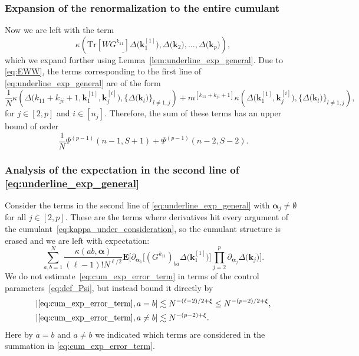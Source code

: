 \documentclass[10pt]{amsart}
\numberwithin{equation}{section}
\newcommand{\E}{\mathbf{E}}
\begin{document}
\subsubsection{Expansion of the renormalization to the entire cumulant}\label{sec:hit_two_args}
Now we are left with the term
\begin{equation}
\kappa\left(\underline{\mathrm{Tr}\left[WG^{k_{11}}\right]\Delta\big(\bm{k}^{[1]}_1\big)}, \Delta\big(\bm{k}_2\big),\ldots, \Delta\big(\bm{k}_p\big)\right),
\end{equation}
which we expand further using Lemma~\ref{lem:underline_exp_general}. Due to \eqref{eq:EWW}, the terms corresponding to the first line of \eqref{eq:underline_exp_general} are of the form
\begin{equation}
\frac{1}{N}\kappa\left(\Delta\big(k_{11}+k_{ji}+1,\bm{k}_1^{[1]},\bm{k}_j^{[i]}\big),\{\Delta\big(\bm{k}_l\big)\}_{l\neq 1,j}\right)+ m^{[k_{11}+k_{ji}+1]}\kappa\left(\Delta\big(\bm{k}_1^{[1]},\bm{k}_j^{[i]}\big),\{\Delta\big(\bm{k}_l\big)\}_{l\neq 1,j}\right),
\end{equation}
for $j\in [2,p]$ and $i\in [n_j]$. Therefore, the sum of these terms has an upper bound of order
\begin{equation}
\frac{1}{N}\Psi^{(p-1)}(n-1,S+1)+\Psi^{(p-1)}(n-2,S-2).
\label{eq:err_1_2}
\end{equation}

\subsubsection{Analysis of the expectation in the second line of \eqref{eq:underline_exp_general}}\label{sec:cum_exp_last_term}
Consider the terms in the second line of \eqref{eq:underline_exp_general} with $\bm{\alpha}_j\neq\emptyset$ for all $j\in [2,p]$. These are the terms where derivatives hit every argument of the cumulant~\eqref{eq:kappa_under_consideration}, so the cumulant structure is erased and we are left with expectation:
\begin{equation}
\sum_{a,b=1}^N\frac{\kappa(ab,\bm{\alpha})}{(\ell-1)!N^{\ell/2}}\E\bigg[\partial_{\bm{\alpha}_1}\Big[\left(G^{k_{11}}\right)_{ba}\Delta\big(\bm{k}_1^{[1]}\big)\Big] \prod_{j=2}^p \partial_{\bm{\alpha}_j}\Delta\big(\bm{k}_j\big)\bigg].
\label{eq:cum_exp_error_term}
\end{equation}
We do not estimate~\eqref{eq:cum_exp_error_term} in terms of the control parameters~\eqref{eq:def_Psi}, but instead bound it directly by
\begin{align}
|\eqref{eq:cum_exp_error_term},a=b|&\lesssim N^{-(\ell-2)/2+\xi}\le N^{-(p-2)/2+\xi},\label{eq:cum_exp_error_term_bound_d}\\
|\eqref{eq:cum_exp_error_term},a\neq b|&\lesssim N^{-(p-2)+\xi}.
\label{eq:cum_exp_error_term_bound_od}
\end{align}
Here by $a=b$ and $a\neq b$ we indicated which terms are considered in the summation in \eqref{eq:cum_exp_error_term}.
\end{document}
